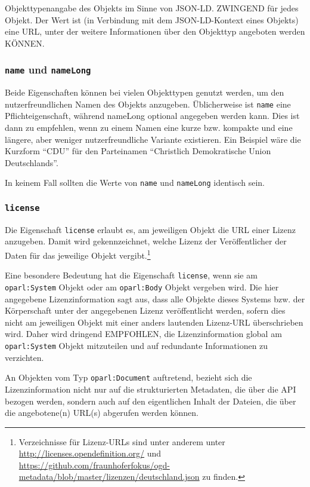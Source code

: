 \documentclass[,a4paper]{article}
\begin{document}
Objekttypenangabe des Objekts im Sinne von JSON-LD. ZWINGEND für jedes
Objekt. Der Wert ist (in Verbindung mit dem JSON-LD-Kontext eines
Objekts) eine URL, unter der weitere Informationen über den Objekttyp
angeboten werden KÖNNEN.

\subsubsection{\texttt{name} und
\texttt{nameLong}}\label{name-und-namelong}

Beide Eigenschaften können bei vielen Objekttypen genutzt werden, um den
nutzerfreundlichen Namen des Objekts anzugeben. Üblicherweise ist
\texttt{name} eine Pflichteigenschaft, während nameLong optional
angegeben werden kann. Dies ist dann zu empfehlen, wenn zu einem Namen
eine kurze bzw. kompakte und eine längere, aber weniger
nutzerfreundliche Variante existieren. Ein Beispiel wäre die Kurzform
``CDU'' für den Parteinamen ``Christlich Demokratische Union
Deutschlands''.

In keinem Fall sollten die Werte von \texttt{name} und \texttt{nameLong}
identisch sein.

\subsubsection{\texttt{license}}\label{license}

Die Eigenschaft \texttt{license} erlaubt es, am jeweiligen Objekt die
URL einer Lizenz anzugeben. Damit wird gekennzeichnet, welche Lizenz der
Veröffentlicher der Daten für das jeweilige Objekt vergibt.\footnote{Verzeichnisse
  für Lizenz-URLs sind unter anderem unter
  \url{http://licenses.opendefinition.org/} und
  \url{https://github.com/fraunhoferfokus/ogd-metadata/blob/master/lizenzen/deutschland.json}
  zu finden.}

Eine besondere Bedeutung hat die Eigenschaft \texttt{license}, wenn sie
am \texttt{oparl:System} Objekt oder am \texttt{oparl:Body} Objekt
vergeben wird. Die hier angegebene Lizenzinformation sagt aus, dass alle
Objekte dieses Systems bzw. der Körperschaft unter der angegebenen
Lizenz veröffentlicht werden, sofern dies nicht am jeweiligen Objekt mit
einer anders lautenden Lizenz-URL überschrieben wird. Daher wird
dringend EMPFOHLEN, die Lizenzinformation global am
\texttt{oparl:System} Objekt mitzuteilen und auf redundante
Informationen zu verzichten.

An Objekten vom Typ \texttt{oparl:Document} auftretend, bezieht sich die
Lizenzinformation nicht nur auf die strukturierten Metadaten, die über
die API bezogen werden, sondern auch auf den eigentlichen Inhalt der
Dateien, die über die angebotene(n) URL(s) abgerufen werden können.
\end{document}
